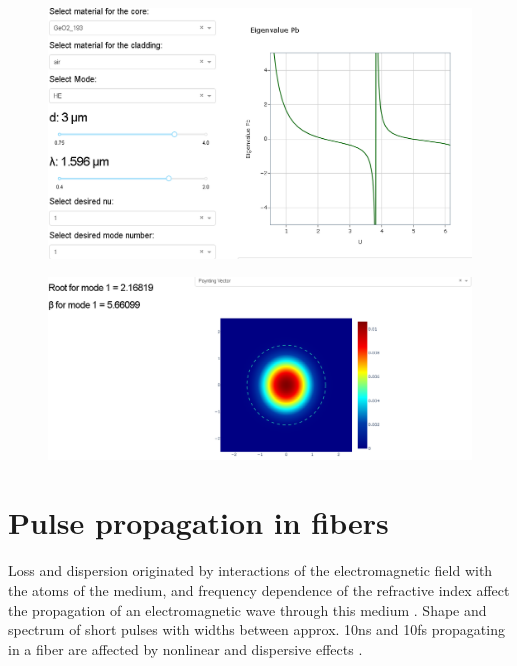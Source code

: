 \begin{figure}[label={fig:fibre1}, caption={\href{https://fiber-mode-app.herokuapp.com/apps/results}{Heroku app} for the optical fiber (1).}]
	\includegraphics[width=.8\textwidth]{figures/chap2/fibre1.PNG} 
\end{figure}

\begin{figure}[label={fig:fibre2}, caption={\href{https://fiber-mode-app.herokuapp.com/apps/results}{Heroku app} for the optical fiber (2).}]
	\includegraphics[width=.8\textwidth]{figures/chap2/fibre2.PNG} 
\end{figure}


   


\section{Pulse propagation in fibers}

Loss and dispersion originated by interactions of the electromagnetic field with the atoms of the medium, and frequency dependence of the refractive index affect the propagation of an electromagnetic wave through this medium \citep{dudley_taylor_2010}. Shape and spectrum of short pulses with widths between approx. 10ns and 10fs propagating in a fiber are affected by nonlinear and dispersive effects \citep{AgrawalBook}.  

